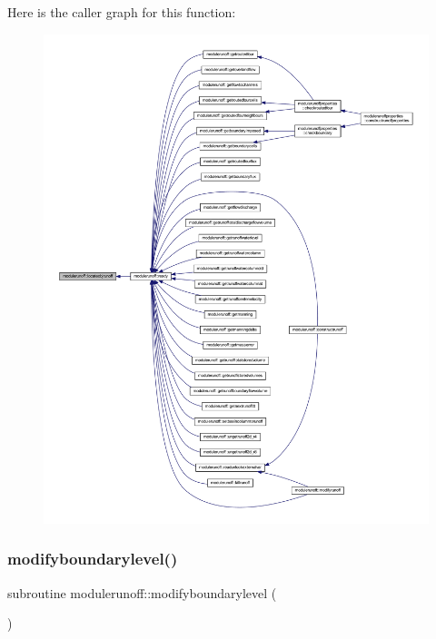 Here is the caller graph for this function\+:\nopagebreak
\begin{figure}[H]
\begin{center}
\leavevmode
\includegraphics[width=350pt]{namespacemodulerunoff_a573ec5acc76c43856a82166862259a60_icgraph}
\end{center}
\end{figure}
\mbox{\label{namespacemodulerunoff_aac03c1526e1f45dcfe31d200ac141d7e}} 
\subsubsection{\texorpdfstring{modifyboundarylevel()}{modifyboundarylevel()}}
{\footnotesize\ttfamily subroutine modulerunoff\+::modifyboundarylevel (\begin{DoxyParamCaption}{ }\end{DoxyParamCaption})\hspace{0.3cm}{\ttfamily [private]}}

